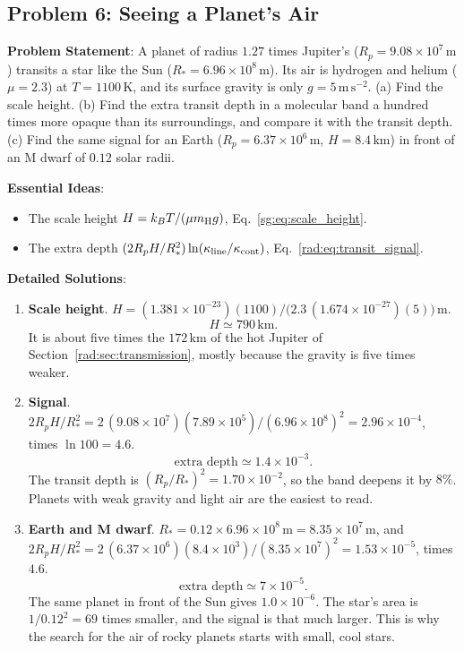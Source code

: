 \subsection{Problem 6: Seeing a Planet's Air}
\label{rad:prob:transmission}

\textbf{Problem Statement}: A planet of radius $1.27$ times Jupiter's ($R_p=9.08\times10^7\,\mathrm m$) transits a star like the Sun ($R_*=6.96\times10^8\,\mathrm m$). Its air is hydrogen and helium ($\mu=2.3$) at $T=1100\,\mathrm K$, and its surface gravity is only $g=5\,\mathrm{m\,s^{-2}}$. (a) Find the scale height. (b) Find the extra transit depth in a molecular band a hundred times more opaque than its surroundings, and compare it with the transit depth. (c) Find the same signal for an Earth ($R_p=6.37\times10^6\,\mathrm m$, $H=8.4\,\mathrm{km}$) in front of an M dwarf of $0.12$ solar radii.

\textbf{Essential Ideas}:
\begin{itemize}
	\item The scale height $H=k_BT/(\mu m_{\rm H}g)$, Eq.~\eqref{sg:eq:scale_height}.
	\item The extra depth $(2R_pH/R_*^2)\ln(\kappa_{\rm line}/\kappa_{\rm cont})$, Eq.~\eqref{rad:eq:transit_signal}.
\end{itemize}

\textbf{Detailed Solutions}:
\begin{enumerate}[label=(\alph*)]
	\item \textbf{Scale height}. $H=(1.381\times10^{-23})(1100)/\big(2.3\,(1.674\times10^{-27})(5)\big)\,\mathrm m$.
	\[
	\boxed{H\simeq790\,\mathrm{km}.}
	\]
	It is about five times the $172\,\mathrm{km}$ of the hot Jupiter of Section~\ref{rad:sec:transmission}, mostly because the gravity is five times weaker.
	\item \textbf{Signal}. $2R_pH/R_*^2=2\,(9.08\times10^7)(7.89\times10^5)/(6.96\times10^8)^2=2.96\times10^{-4}$, times $\ln100=4.6$.
	\[
	\boxed{\text{extra depth}\simeq1.4\times10^{-3}.}
	\]
	The transit depth is $(R_p/R_*)^2=1.70\times10^{-2}$, so the band deepens it by $8\%$. Planets with weak gravity and light air are the easiest to read.
	\item \textbf{Earth and M dwarf}. $R_*=0.12\times6.96\times10^8\,\mathrm m=8.35\times10^7\,\mathrm m$, and $2R_pH/R_*^2=2\,(6.37\times10^6)(8.4\times10^3)/(8.35\times10^7)^2=1.53\times10^{-5}$, times $4.6$.
	\[
	\boxed{\text{extra depth}\simeq7\times10^{-5}.}
	\]
	The same planet in front of the Sun gives $1.0\times10^{-6}$. The star's area is $1/0.12^2=69$ times smaller, and the signal is that much larger. This is why the search for the air of rocky planets starts with small, cool stars.
\end{enumerate}
